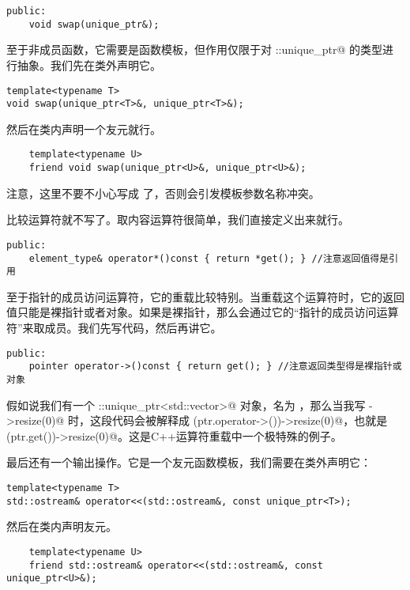 \begin{lstlisting}
public:
    void swap(unique_ptr&);
\end{lstlisting}
至于非成员函数，它需要是函数模板，但作用仅限于对 \lstinline@user::unique_ptr@ 的类型进行抽象。我们先在类外声明它。
\begin{lstlisting}
template<typename T>
void swap(unique_ptr<T>&, unique_ptr<T>&);
\end{lstlisting}
然后在类内声明一个友元就行。
\begin{lstlisting}
    template<typename U>
    friend void swap(unique_ptr<U>&, unique_ptr<U>&);
\end{lstlisting}
注意，这里不要不小心写成 \lstinline@T@ 了，否则会引发模板参数名称冲突。\par
比较运算符就不写了。取内容运算符很简单，我们直接定义出来就行。
\begin{lstlisting}
public:
    element_type& operator*()const { return *get(); } //注意返回值得是引用
\end{lstlisting}
至于指针的成员访问运算符，它的重载比较特别。当重载这个运算符时，它的返回值只能是裸指针或者对象。如果是裸指针，那么会通过它的``指针的成员访问运算符''来取成员。我们先写代码，然后再讲它。
\begin{lstlisting}
public:
    pointer operator->()const { return get(); } //注意返回类型得是裸指针或对象
\end{lstlisting}
假如说我们有一个 \lstinline@user::unique_ptr<std::vector>@ 对象，名为 \lstinline@ptr@，那么当我写 \lstinline@ptr->resize(0)@ 时，这段代码会被解释成 \lstinline@(ptr.operator->())->resize(0)@，也就是 \lstinline@(ptr.get())->resize(0)@。这是C++运算符重载中一个极特殊的例子。\par
最后还有一个输出操作。它是一个友元函数模板，我们需要在类外声明它：
\begin{lstlisting}
template<typename T>
std::ostream& operator<<(std::ostream&, const unique_ptr<T>);
\end{lstlisting}
然后在类内声明友元。
\begin{lstlisting}
    template<typename U>
    friend std::ostream& operator<<(std::ostream&, const unique_ptr<U>&);
\end{lstlisting}\par
